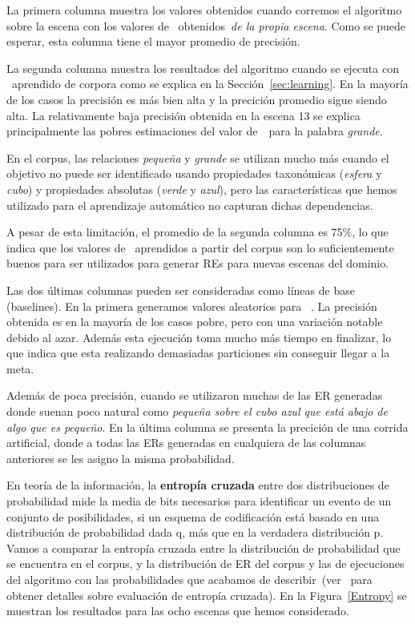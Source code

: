 La primera columna muestra los valores obtenidos cuando corremos el algoritmo sobre la escena
con los valores de \puse\ obtenidos~\emph{de la propia escena}. Como se puede esperar,
esta columna tiene el mayor promedio de precisi\'on.

La segunda columna muestra los resultados del algoritmo cuando se ejecuta con \puse\ aprendido de
corpora como se explica en la Secci\'on~\ref{sec:learning}. En la mayor\'{i}a de los casos la precisi\'on
es m\'as bien alta y la precici\'on promedio sigue siendo alta. La relativamente baja precisi\'on
obtenida en la escena 13 se explica principalmente las pobres estimaciones del valor de~\puse\ para la palabra \emph{grande}. 

En el corpus, las relaciones \emph{peque\~na} y \emph{grande} se utilizan mucho m\'as cuando el objetivo no puede ser identificado usando propiedades taxon\'omicas (\emph{esfera} y \emph{cubo}) y propiedades absolutas (\emph{verde} y \emph{azul}), pero las caracter\'{i}sticas que hemos utilizado para el aprendizaje autom\'atico no capturan dichas dependencias.

A pesar de esta limitaci\'on, el promedio de la segunda columna es 75\%, lo que indica que los valores de \puse\ aprendidos a partir del corpus son lo suficientemente buenos para ser utilizados para generar REs para nuevas escenas del dominio.

Las dos \'ultimas columnas pueden ser consideradas como l\'{i}neas de base (baselines). En la primera generamos
valores aleatorios para \puse\ . La precisi\'on obtenida es en la mayor\'{i}a de los casos pobre, pero con
una variaci\'on notable debido al azar. Adem\'as esta ejecuci\'on toma mucho m\'as tiempo en finalizar, lo que indica que esta realizando demasiadas particiones sin conseguir llegar a la meta.

Adem\'as de poca precisi\'on, cuando se utilizaron muchas de las ER generadas donde suenan poco natural como \textit{peque\~na sobre
el cubo azul que est\'a abajo de algo que es peque\~no}. En la \'ultima columna se presenta la precici\'on de una corrida artificial, donde a todas las ERs generadas en cualquiera de las columnas anteriores se les asigno la misma probabilidad.

En teor\'ia de la informaci\'on, la \textbf{entrop\'ia cruzada} entre dos distribuciones de probabilidad mide la media de bits necesarios para identificar un evento de un conjunto de posibilidades, si un esquema de codificaci\'on est\'a basado en una distribuci\'on de probabilidad dada q, m\'as que en la verdadera distribuci\'on p. Vamos a comparar la entrop\'ia cruzada entre la distribuci\'on de probabilidad que se encuentra en el corpus, y la distribuci\'on de ER del corpus y las de ejecuciones del algoritmo con las probabilidades que acabamos de describir~(ver~\cite{juraksky:spee08} para obtener detalles sobre evaluaci\'on de entrop\'{i}a cruzada). En la Figura~\ref{Entropy} se muestran los resultados para las ocho escenas que hemos considerado.

